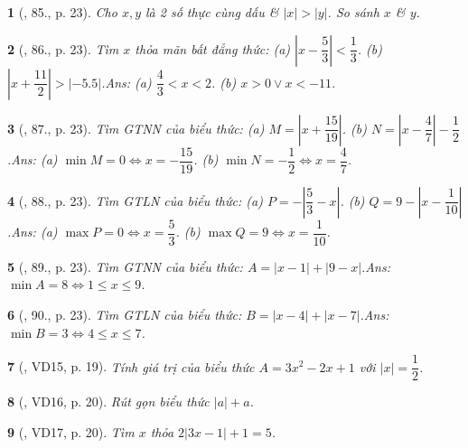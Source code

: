 \documentclass{article}
\newtheorem{baitoan}{}
\begin{document}
\begin{baitoan}[\cite{Tuyen_Toan_7}, 85., p. 23]
	Cho $x,y$ là 2 số thực cùng dấu \& $|x| > |y|$. So sánh $x$ \& $y$.
\end{baitoan}

\begin{baitoan}[\cite{Tuyen_Toan_7}, 86., p. 23]
	Tìm $x$ thỏa mãn bất đẳng thức: (a) $\left|x - \dfrac{5}{3}\right| < \dfrac{1}{3}$. (b) $\left|x + \dfrac{11}{2}\right| > |-5.5|$.\hfill{\sf Ans:} (a) $\dfrac{4}{3} < x < 2$. (b) $x > 0\lor x < -11$.
\end{baitoan}

\begin{baitoan}[\cite{Tuyen_Toan_7}, 87., p. 23]
	Tìm {\rm GTNN} của biểu thức: (a) $M = \left|x + \dfrac{15}{19}\right|$. (b) $N = \left|x - \dfrac{4}{7}\right| - \dfrac{1}{2}$.\hfill{\sf Ans:} (a) $\min M = 0\Leftrightarrow x = -\dfrac{15}{19}$. (b) $\min N = -\dfrac{1}{2}\Leftrightarrow x = \dfrac{4}{7}$.
\end{baitoan}

\begin{baitoan}[\cite{Tuyen_Toan_7}, 88., p. 23]
	Tìm {\rm GTLN} của biểu thức: (a) $P = -\left|\dfrac{5}{3} - x\right|$. (b) $Q = 9 - \left|x - \dfrac{1}{10}\right|$.\hfill{\sf Ans:} (a) $\max P = 0\Leftrightarrow x = \dfrac{5}{3}$. (b) $\max Q = 9\Leftrightarrow x = \dfrac{1}{10}$.
\end{baitoan}

\begin{baitoan}[\cite{Tuyen_Toan_7}, 89., p. 23]
	Tìm {\rm GTNN} của biểu thức: $A = |x - 1| + |9 - x|$.\hfill{\sf Ans:} $\min A = 8\Leftrightarrow 1\le x\le 9$.
\end{baitoan}

\begin{baitoan}[\cite{Tuyen_Toan_7}, 90., p. 23]
	Tìm {\rm GTLN} của biểu thức: $B = |x - 4| + |x - 7|$.\hfill{\sf Ans:} $\min B = 3\Leftrightarrow 4\le x\le 7$.
\end{baitoan}

\begin{baitoan}[\cite{Binh_Toan_7_tap_1}, VD15, p. 19]
	Tính giá trị của biểu thức $A = 3x^2 - 2x + 1$ với $|x| = \dfrac{1}{2}$.
\end{baitoan}

\begin{baitoan}[\cite{Binh_Toan_7_tap_1}, VD16, p. 20]
	Rút gọn biểu thức $|a| + a$.
\end{baitoan}

\begin{baitoan}[\cite{Binh_Toan_7_tap_1}, VD17, p. 20]
	Tìm $x$ thỏa $2|3x - 1| + 1 = 5$.
\end{baitoan}
\end{document}
